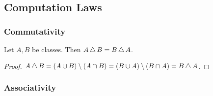 \documentclass[10pt]{article}
\begin{document}
  \subsection*{Computation Laws}

  \subsubsection*{Commutativity}

  \begin{forthel}
    \begin{proposition}
      Let $A, B$ be classes.
      Then $A \mathop{\triangle} B = B \mathop{\triangle} A$.
    \end{proposition}
    \begin{proof}
      $A \mathop{\triangle} B
        = (A \cup B) \setminus (A \cap B)
        = (B \cup A) \setminus (B \cap A)
        = B \mathop{\triangle} A$.
    \end{proof}
  \end{forthel}


  \subsubsection*{Associativity}
\end{document}
